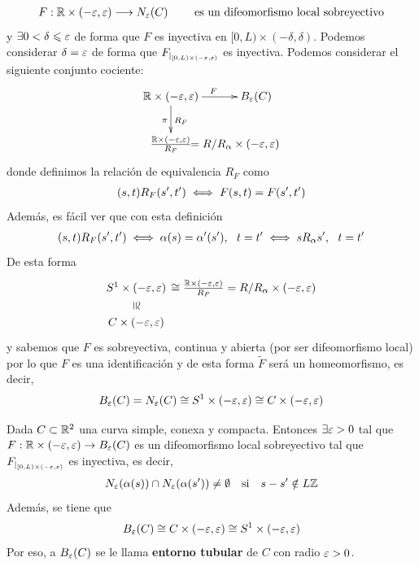 \begin{gather*}
    F: \mathbb{R}\times (-\varepsilon, \varepsilon) \longrightarrow N_\varepsilon(C) \qquad \text{ es un difeomorfismo local sobreyectivo}
\end{gather*}
y $\exists 0 < \delta \leqslant \varepsilon$ de forma que $F$ es inyectiva en $[0,L) \times (-\delta, \delta)$. Podemos considerar $\delta=\varepsilon$ de forma que $F_{|_{[0,L)\times(-\varepsilon, \varepsilon)}}$ es inyectiva. Podemos considerar el siguiente conjunto cociente:
\begin{gather*}
    \xymatrix{
        \bb{R}\times(-\veps, \veps) \ar[r]^{F} \ar[d]_\pi^{R_F} & B_\veps(C) \\
        \frac{\bb{R}\times (-\veps, \veps)}{R_F} & \hspace{-1.4cm} {{} = R/R_\alpha \times (-\veps, \veps)}
    }
\end{gather*}
donde definimos la relación de equivalencia $R_F$ como
\begin{gather*}
    (s,t)R_F (s',t') \sii F(s,t) = F(s',t') %
\end{gather*}
Además, es fácil ver que con esta definición
\begin{gather*}
    (s,t)R_F (s',t') \iff \alpha(s)=\alpha'(s'),\ \ t=t' \iff sR_\alpha s',\ \ t=t'
\end{gather*}
De esta forma
\begin{gather*}
    \xymatrix@R=1.2em{
        S^1 \times (-\veps, \veps) \ar@{}[d]|{\rotatebox{-90}{$\cong$}} & \hspace{-0.9cm} \cong \frac{\bb{R}\times(-\veps, \veps)}{R_F} = R/R_\alpha \times (-\veps, \veps)\\
        C\times(-\veps, \veps)
    }
\end{gather*}
y sabemos que $F$ es sobreyectiva, continua y abierta (por ser difeomorfismo local) por lo que $F$ es una identificación y de esta forma $\tilde{F}$ será un homeomorfismo, es decir,
\begin{gather*}
    B_\varepsilon(C) = N_\varepsilon(C) \cong S^1 \times (-\varepsilon, \varepsilon)\cong C \times(-\varepsilon, \varepsilon)
\end{gather*}

\begin{teo}\label{teo:exist_ent_tub}
    Dada $C\subset \mathbb{R}^2$ una curva simple, conexa y compacta. Entonces $\exists \varepsilon > 0$ tal que $F:\mathbb{R}\times(-\varepsilon, \varepsilon) \to B_\varepsilon(C)$ es un difeomorfismo local sobreyectivo tal que $F_{|_{[0,L)\times(-\varepsilon, \varepsilon)}}$ es inyectiva, es decir,
    \begin{gather*}
        N_\varepsilon(\alpha(s))\cap N_\varepsilon(\alpha(s')) \neq \emptyset \quad \text{si} \quad s-s'\notin L\mathbb{Z}
    \end{gather*}
    Además, se tiene que 
    \begin{gather*}
        B_\varepsilon(C) \cong C \times(-\varepsilon, \varepsilon) \cong S^1 \times (-\varepsilon, \varepsilon)
    \end{gather*}
    Por eso, a $B_\varepsilon(C)$ se le llama \textbf{entorno tubular} de $C$ con radio $\varepsilon>0$.
\end{teo}

